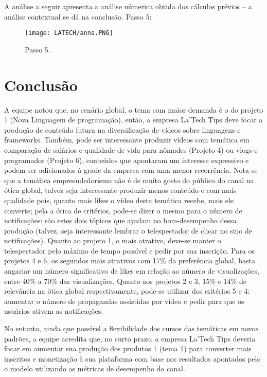 \documentclass[onecolumn,11pt]{asme2ej}
\begin{document}
A análise a seguir apresenta a análise númerica obtida dos cálculos prévios -- a análise contextual se dá na conclusão. Passo 5: 

\FloatBarrier
\begin{figure}[h]
    \centering
    \texttt{[image: LATECH/anns.PNG]}
    \caption{Passo 5.}
    \label{fig:ans}
\end{figure}
\FloatBarrier

\section{Conclusão}

A equipe notou que, no cenário global, o tema com maior demanda é o do projeto 1 (Nova Linguagem de programação), então, a empresa La'Tech Tips deve focar a produção de conteúdo futura na diversificação de vídeos sobre linguagens e frameworks. Também, pode ser interessante produzir vídeos com temática em comparação de salários e qualidade de vida para nômades (Projeto 4) ou vlogs e programador (Projeto 6), conteúdos que apontaram um interesse expressivo e podem ser adicionados à grade da empresa com uma menor recorrência. Nota-se que a temática empreendedorismo não é de muito gosto do público do canal na ótica global, talvez seja interessante produzir menos conteúdo e com mais qualidade pois, quanto mais likes o vídeo desta temática recebe, mais ele converte; pela a ótica de critérios, pode-se dizer o mesmo para o número de notificações: são estes dois tópicos que ajudam no bom-desempenho dessa produção (talvez, seja interessante lembrar o telespectador de clicar no sino de notificações).
Quanto ao projeto 1, o mais atrativo, deve-se manter o telespectador pelo máximo de tempo possível e pedir por sua inscrição. Para os projetos 4 e 6, os segundos mais atrativos com 17\% da preferência global, basta angariar um número significativo de likes em relação ao número de visualizações, entre 40\% a 70\% das visualizações.
Quanto aos projetos 2 e 3, 15\% e 14\% de relevância na ótica global respectivamente, pode-se utilizar dos critérios 5 e 4: aumentar o número de propagandas assistidas por vídeo e pedir para que os usuários ativem as notificações.

No entanto, ainda que possível a flexibilidade dos cursos das temáticas em novos padrões, a equipe acredita que, no curto prazo, a empresa La'Tech Tips deveria focar em aumentar sua produção dos produtos 1 (tema 1) para converter mais inscritos e monetização à sua plataforma com base nos resultados apontados pelo o modelo utilizando as métricas de desempenho do canal.

\printbibliography
\end{document}
